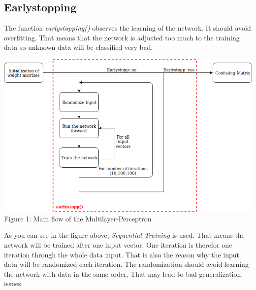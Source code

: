 \documentclass[10pt,a4paper]{article}
\begin{document}
	\subsection{Earlystopping}				%
	The function \textit{earlystopping()} observes the learning of the network. It should avoid overfitting. That means that the network is adjusted too much to the training data so unknown data will be classified very bad.
	\begin{center}
		\includegraphics[width=0.9\linewidth]{"pictures/Untitled Diagram"} \\
		Figure 1: Main flow of the Multilayer-Perceptron 
	\end{center}
	As you can see in the figure above, \textit{Sequential Training} is used. That means the network will be trained after one input vector. One iteration is therefor one iteration through the whole data input. That is also the reason why the input data will be randomized each iteration. The randomization should avoid learning the network with data in the same order. That may lead to bad generalization issues.
\end{document}
